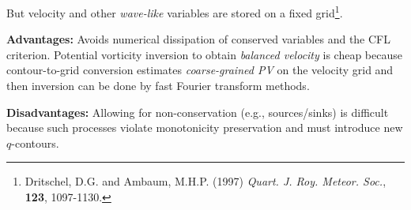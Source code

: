 	But velocity and other {\em wave-like} variables are stored on a fixed
	grid\footnote{\BTi Dritschel, D.G. and Ambaum, M.H.P. (1997) \emph{ Quart. J. Roy. Meteor. Soc.}, {\bf 123},
		1097-1130.\ETi}.
	
	{\bf Advantages:} Avoids numerical dissipation of conserved variables
	and the CFL criterion. Potential vorticity inversion to obtain {\em
		balanced velocity} is cheap because contour-to-grid conversion
	estimates {\em coarse-grained PV} on the velocity grid and then inversion
	can be done by fast Fourier transform methods.
	
	{\bf Disadvantages:} Allowing for non-conservation (e.g.,
	sources/sinks) is difficult because such processes violate
	monotonicity preservation and must introduce new $q$-contours.